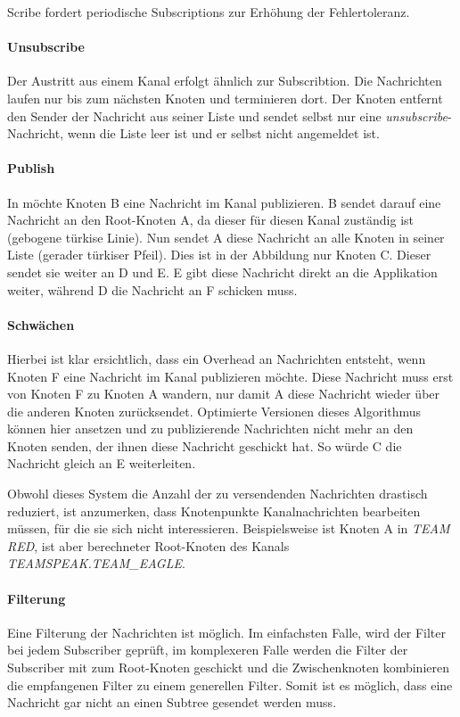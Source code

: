 Scribe fordert periodische Subscriptions zur Erhöhung der Fehlertoleranz.

\paragraph*{Unsubscribe}
Der Austritt aus einem Kanal erfolgt ähnlich zur Subscribtion. Die Nachrichten laufen nur bis zum nächsten Knoten und terminieren dort. Der Knoten entfernt den Sender der Nachricht aus seiner Liste und sendet selbst nur eine \emph{unsubscribe}-Nachricht, wenn die Liste leer ist und er selbst nicht angemeldet ist.

\paragraph*{Publish}
In  möchte Knoten B eine Nachricht im Kanal publizieren. B sendet darauf eine Nachricht an den Root-Knoten A, da dieser für diesen Kanal zuständig ist (gebogene türkise Linie). Nun sendet A diese Nachricht an alle Knoten in seiner Liste (gerader türkiser Pfeil). Dies ist in der Abbildung nur Knoten C. Dieser sendet sie weiter an D und E. E gibt diese Nachricht direkt an die Applikation weiter, während D die Nachricht an F schicken muss.


\paragraph*{Schwächen}
Hierbei ist klar ersichtlich, dass ein Overhead an Nachrichten entsteht, wenn Knoten F eine Nachricht im Kanal publizieren möchte. Diese Nachricht muss erst von Knoten F zu Knoten A wandern, nur damit A diese Nachricht wieder über die anderen Knoten zurücksendet. Optimierte Versionen dieses Algorithmus können hier ansetzen und zu publizierende Nachrichten nicht mehr an den Knoten senden, der ihnen diese Nachricht geschickt hat. So würde C die Nachricht gleich an E weiterleiten.


Obwohl dieses System die Anzahl der zu versendenden Nachrichten drastisch reduziert, ist anzumerken, dass Knotenpunkte Kanalnachrichten bearbeiten müssen, für die sie sich nicht interessieren. Beispielsweise ist Knoten A in \emph{TEAM RED}, ist aber berechneter Root-Knoten des Kanals \emph{TEAMSPEAK.TEAM\_EAGLE}.


\paragraph*{Filterung}
Eine Filterung der Nachrichten ist möglich. Im einfachsten Falle, wird der Filter bei jedem Subscriber geprüft, im komplexeren Falle werden die Filter der Subscriber mit zum Root-Knoten geschickt und die Zwischenknoten kombinieren die empfangenen Filter zu einem generellen Filter. Somit ist es möglich, dass eine Nachricht gar nicht an einen Subtree gesendet werden muss.


